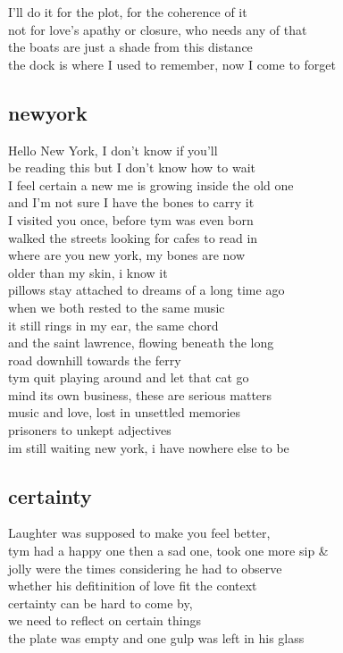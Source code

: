 \documentclass{article}
\begin{document}
I'll do it for the plot, for the coherence of it\\
not for love's apathy or closure, who needs any of that\\
the boats are just a shade from this distance\\
the dock is where I used to remember, now I come to forget\\


\clearpage

\subsection{newyork}

Hello New York, I don't know if you'll\\
be reading this but I don't know how to wait\\
I feel certain a new me is growing inside the old one\\
and I'm not sure I have the bones to carry it\\
I visited you once, before tym was even born\\
walked the streets looking for cafes to read in\\

where are you new york, my bones are now\\
older than my skin, i know it\\
pillows stay attached to dreams of a long time ago\\
when we both rested to the same music\\
it still rings in my ear, the same chord\\
and the saint lawrence, flowing beneath the long\\
road downhill towards the ferry\\

tym quit playing around and let that cat go\\
mind its own business, these are serious matters\\
music and love, lost in unsettled memories\\
prisoners to unkept adjectives\\
im still waiting new york, i have nowhere else to be\\
\clearpage

\subsection{certainty}

Laughter was supposed to make you feel better,\\
tym had a happy one then a sad one, took one more sip &\\
jolly were the times considering he had to observe\\
whether his defitinition of love fit the context\\
certainty can be hard to come by,\\
we need to reflect on certain things\\
the plate was empty and one gulp was left in his glass\\
\end{document}
